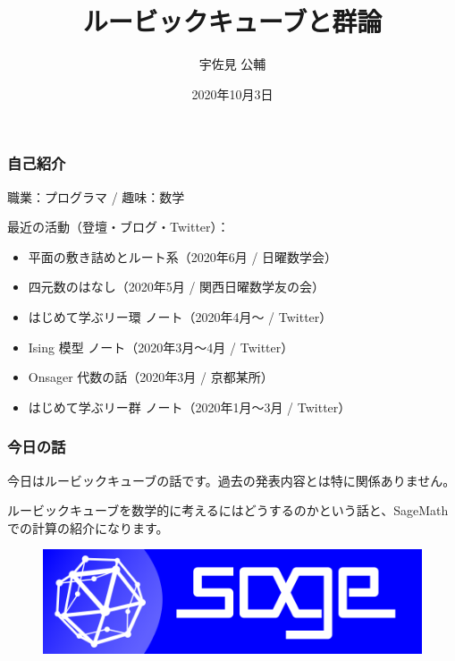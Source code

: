 \documentclass{beamer}
\title{ルービックキューブと群論}
\author{宇佐見 公輔}
\date{2020年10月3日}
\begin{document}
\maketitle

\begin{frame}
    \frametitle{自己紹介}

    職業：プログラマ / 趣味：数学

    \bigskip

    最近の活動（登壇・ブログ・Twitter）：
    \begin{itemize}
        \item 平面の敷き詰めとルート系（2020年6月 / 日曜数学会）
        \item 四元数のはなし（2020年5月 / 関西日曜数学友の会）
        \item はじめて学ぶリー環 ノート（2020年4月〜 / Twitter）
        \item Ising 模型 ノート（2020年3月〜4月 / Twitter）
        \item Onsager 代数の話（2020年3月 / 京都某所）
        \item はじめて学ぶリー群 ノート（2020年1月〜3月 / Twitter）
    \end{itemize}
\end{frame}

\begin{frame}
    \frametitle{今日の話}

    今日はルービックキューブの話です。過去の発表内容とは特に関係ありません。

    \bigskip

    ルービックキューブを数学的に考えるにはどうするのかという話と、SageMath での計算の紹介になります。

    \begin{figure}
        \includegraphics[scale=0.25]{images/logo_sagemath+icon_oldstyle.png}
    \end{figure}
\end{frame}
\end{document}
